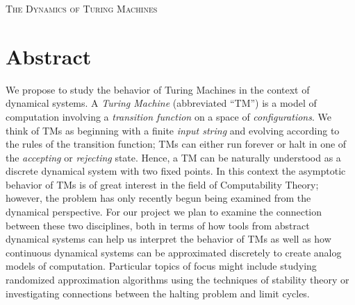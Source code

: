 \documentclass{fkpset}
\begin{document}

\begin{center}
  \vspace{-2.0cm}
  \scshape \LARGE The Dynamics of Turing Machines
  \vspace{1.05cm}
\end{center}

\section{Abstract}
We propose to study the behavior of Turing Machines in the context of
dynamical systems. A \emph{Turing Machine} (abbreviated ``TM'') is a
model of computation involving a \emph{transition function} on a space
of \emph{configurations}. We think of TMs as beginning with a finite
\emph{input string} and evolving according to the rules of the
transition function; TMs can either run forever or halt in one of the
\emph{accepting} or \emph{rejecting} state.
Hence, a TM can be naturally understood as a discrete dynamical system
with two fixed points. In this context the asymptotic behavior of TMs
is of great interest in the field of Computability Theory; however,
the problem has only recently begun being examined from the dynamical
perspective. For our project we plan to examine the connection between
these two disciplines, both in terms of how tools from abstract
dynamical systems can help us interpret the behavior of TMs as well as
how continuous dynamical systems can be approximated discretely to
create analog models of computation. Particular topics of focus might
include studying randomized approximation algorithms using the
techniques of stability theory or investigating connections between
the halting problem and limit cycles.
\end{document}
